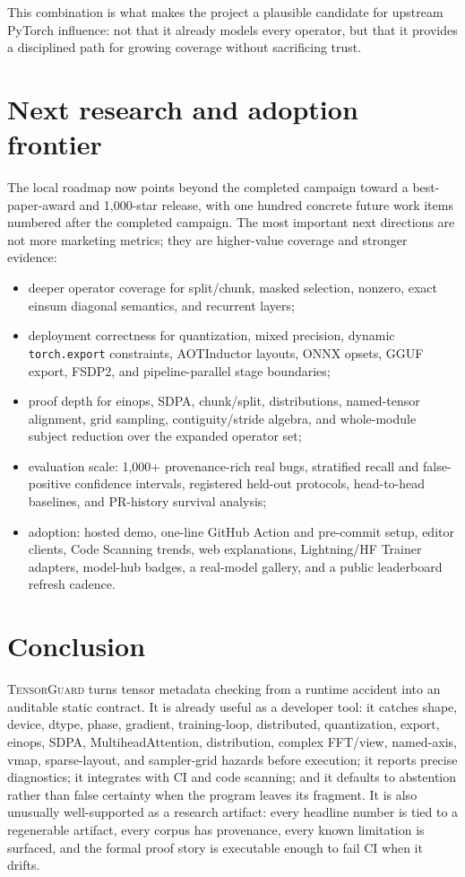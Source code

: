 \documentclass[11pt]{article}
\newcommand{\tg}{\textsc{TensorGuard}}
\begin{document}
This combination is what makes the project a plausible candidate for upstream
PyTorch influence: not that it already models every operator, but that it
provides a disciplined path for growing coverage without sacrificing trust.

\section{Next research and adoption frontier}

The local roadmap now points beyond the completed campaign toward a
best-paper-award and 1,000-star release, with one hundred concrete future work
items numbered after the completed campaign.  The most important next
directions are not more marketing metrics; they are higher-value coverage and
stronger evidence:

\begin{itemize}[leftmargin=2em]
  \item deeper operator coverage for split/chunk, masked selection, nonzero,
  exact einsum diagonal semantics, and recurrent layers;
  \item deployment correctness for quantization, mixed precision, dynamic
  \texttt{torch.export} constraints, AOTInductor layouts, ONNX opsets, GGUF
  export, FSDP2, and pipeline-parallel stage boundaries;
  \item proof depth for einops, SDPA, chunk/split, distributions, named-tensor
  alignment, grid sampling, contiguity/stride algebra, and whole-module subject
  reduction over the expanded operator set;
  \item evaluation scale: 1,000+ provenance-rich real bugs, stratified recall
  and false-positive confidence intervals, registered held-out protocols,
  head-to-head baselines, and PR-history survival analysis;
  \item adoption: hosted demo, one-line GitHub Action and pre-commit setup,
  editor clients, Code Scanning trends, web explanations, Lightning/HF Trainer
  adapters, model-hub badges, a real-model gallery, and a public leaderboard
  refresh cadence.
\end{itemize}

\section{Conclusion}

\tg{} turns tensor metadata checking from a runtime accident into an auditable
static contract.  It is already useful as a developer tool: it catches shape,
device, dtype, phase, gradient, training-loop, distributed, quantization,
export, einops, SDPA, MultiheadAttention, distribution, complex FFT/view,
named-axis, vmap, sparse-layout, and sampler-grid hazards
before execution; it reports precise
diagnostics; it integrates with CI and code scanning; and it defaults to
abstention rather than false certainty when the program leaves its fragment.
It is also unusually well-supported as a research artifact: every headline
number is tied to a regenerable artifact, every corpus has provenance, every
known limitation is surfaced, and the formal proof story is executable enough
to fail CI when it drifts.
\end{document}
